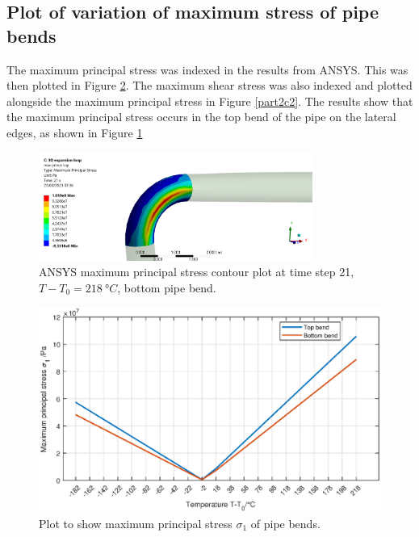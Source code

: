 \subsection{Plot of variation of maximum stress of pipe bends}
The maximum principal stress was indexed in the results from ANSYS. This was then plotted in Figure \ref{part2c1}. The maximum shear stress was also indexed and plotted alongside the maximum principal stress in Figure \ref{part2c2}. The results show that the maximum principal stress occurs in the top bend of the pipe on the lateral edges, as shown in Figure \ref{part2c3}
\begin{figure}[H]
    \centering
    \includegraphics[width = 0.8\textwidth]{img/part2c-1.png}
    \caption{ANSYS maximum principal stress contour plot at time step 21, $T-T_0 = \SI{218}{\degree C}$, bottom pipe bend.}
    \label{part2c3}
\end{figure}
\begin{figure}[H]
    \centering
    \includegraphics[width = \textwidth]{img/part2ci.eps}
    \caption{Plot to show maximum principal stress $\sigma_1$ of pipe bends.}
    \label{part2c1}
\end{figure}
